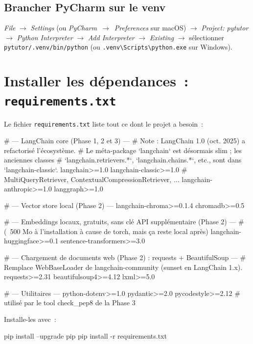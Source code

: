 \documentclass[11pt,a4paper]{article}
\begin{document}
\subsection{Brancher PyCharm sur le venv}

\textit{File} $\to$ \textit{Settings} (ou
\textit{PyCharm}~$\to$~\textit{Preferences} sur macOS)
$\to$ \textit{Project: pytutor} $\to$ \textit{Python Interpreter}
$\to$ \textit{Add Interpreter} $\to$ \textit{Existing} $\to$
sélectionner \texttt{pytutor/.venv/bin/python} (ou
\texttt{.venv\textbackslash{}Scripts\textbackslash{}python.exe}
sur Windows).

\section{Installer les dépendances~: \texttt{requirements.txt}}

Le fichier \texttt{requirements.txt} liste tout ce dont le projet a
besoin~:

\begin{bashcode}
# --- LangChain core (Phase 1, 2 et 3) ---
# Note : LangChain 1.0 (oct. 2025) a refactorisé l'écosystème.
# Le méta-package `langchain` est désormais slim ; les anciennes classes
# `langchain.retrievers.*`, `langchain.chains.*`, etc., sont dans `langchain-classic`.
langchain>=1.0
langchain-classic>=1.0  # MultiQueryRetriever, ContextualCompressionRetriever, ...
langchain-anthropic>=1.0
langgraph>=1.0

# --- Vector store local (Phase 2) ---
langchain-chroma>=0.1.4
chromadb>=0.5

# --- Embeddings locaux, gratuits, sans clé API supplémentaire (Phase 2) ---
# (~500 Mo à l'installation à cause de torch, mais ça reste local après)
langchain-huggingface>=0.1
sentence-transformers>=3.0

# --- Chargement de documents web (Phase 2) : requests + BeautifulSoup ---
# Remplace WebBaseLoader de langchain-community (sunset en LangChain 1.x).
requests>=2.31
beautifulsoup4>=4.12
lxml>=5.0

# --- Utilitaires ---
python-dotenv>=1.0
pydantic>=2.0
pycodestyle>=2.12   # utilisé par le tool check_pep8 de la Phase 3
\end{bashcode}

Installe-les avec~:

\begin{bashcode}
pip install --upgrade pip
pip install -r requirements.txt
\end{bashcode}
\end{document}
